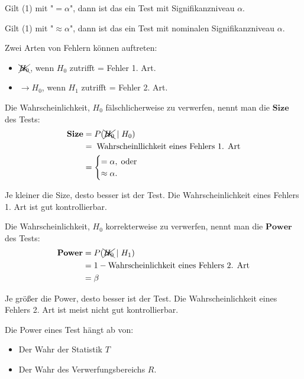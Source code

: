 \documentclass[10pt]{article}
\begin{document}
	Gilt (1) mit "$= \alpha$", dann ist das ein Test mit Signifikanzniveau $\alpha$. 
	
	Gilt (1) mit "$\approx \alpha$", dann ist das ein Test mit nominalen Signifikanzniveau $\alpha$. 
	
	Zwei Arten von Fehlern können auftreten:
	\begin{itemize}
		\item  $\xcancel{H_0}$, wenn $H_0$ zutrifft = Fehler 1. Art.\\
		\item $\rightarrow H_0$, wenn $H_1$ zutrifft = Fehler 2. Art.
	\end{itemize}

	\begin{Definition}
			Die Wahrscheinlichkeit, $H_0$ fälschlicherweise zu verwerfen, nennt man die $\textbf{Size}$ des Tests:
			\begin{equation*}
			\begin{split}
				\textbf{Size} &= P(\xcancel{H_0} \mid H_0)\\
				&= \; \text{Wahrscheinllichkeit eines Fehlers 1. Art}\\
				&= \begin{cases}
					= \alpha, \; \text{oder}\\
					\approx \alpha.
				\end{cases}
			\end{split}
		\end{equation*}
		
		Je kleiner die Size, desto besser ist der Test. Die Wahrscheinlichkeit eines Fehlers 1. Art ist gut kontrollierbar.
	\end{Definition}
	
	\begin{Definition}
		Die Wahrscheinlichkeit, $H_0$ korrekterweise zu verwerfen, nennt man die $\textbf{Power}$ des Tests:
		\begin{equation*}
			\begin{split}
				\textbf{Power} &= P(\xcancel{H_0} \mid H_1)\\
							&= 1 - \text{Wahrscheinlichkeit eines Fehlers 2. Art}\\
							&= \beta
			\end{split}
		\end{equation*}
		
		Je größer die Power, desto besser ist der Test. Die Wahrscheinlichkeit eines Fehlers 2. Art ist meist nicht gut kontrollierbar. 
		
		Die Power eines Test hängt ab von:
		\begin{itemize}
			\item Der Wahr der Statistik $T$
			\item Der Wahr des Verwerfungsbereichs $R$.
		\end{itemize}
	\end{Definition}
\end{document}
